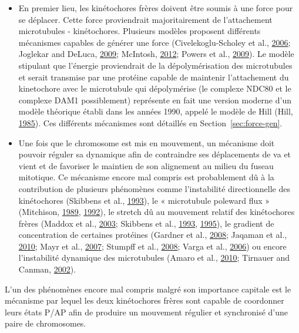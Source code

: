 \documentclass[12pt,a4paper,twoside,openright]{book}
\begin{document}
\begin{itemize}
\item
  En premier lieu, les kinétochores frères doivent être soumis à une
  force pour se déplacer. Cette force proviendrait majoritairement de
  l'attachement microtubules - kinétochores. Plusieurs modèles proposent
  différents mécanismes capables de générer une force
  (Civelekoglu-Scholey et al.,
  \hyperref[ref-Civelekoglu-Scholey2006]{2006}; Joglekar and DeLuca,
  \hyperref[ref-Joglekar2009]{2009}; McIntosh,
  \hyperref[ref-McIntosh2012]{2012}; Powers et al.,
  \hyperref[ref-Powers2009a]{2009}). Le modèle stipulant que l'énergie
  proviendrait de la dépolymérisation des microtubules et serait
  transmise par une protéine capable de maintenir l'attachement du
  kinetochore avec le microtubule qui dépolymérise (le complexe NDC80 et
  le complexe DAM1 possiblement) représente en fait une version moderne
  d'un modèle théorique établi dans les années 1990, appelé le modèle de
  Hill (Hill, \hyperref[ref-Hill1985]{1985}). Ces différents mécanismes
  sont détaillés en Section~\ref{sec:force-gen}.
\item
  Une fois que le chromosome est mis en mouvement, un mécanisme doit
  pouvoir réguler sa dynamique afin de contraindre ses déplacements de
  va et vient et de favoriser le maintien de son alignement au milieu du
  fuseau mitotique. Ce mécanisme encore mal compris est probablement dû
  à la contribution de plusieurs phénomènes comme l'instabilité
  directionnelle des kinétochores (Skibbens et al.,
  \hyperref[ref-Skibbens1993]{1993}), le « microtubule poleward flux »
  (Mitchison, \hyperref[ref-Mitchison1989]{1989},
  \hyperref[ref-Mitchison1992]{1992}), le stretch dû au mouvement
  relatif des kinétochores frères (Maddox et al.,
  \hyperref[ref-Maddox2003]{2003}; Skibbens et al.,
  \hyperref[ref-Skibbens1993]{1993}, \hyperref[ref-Skibbens1995]{1995}),
  le gradient de concentration de certaines protéines (Gardner et al.,
  \hyperref[ref-Gardner2008a]{2008}; Jaqaman et al.,
  \hyperref[ref-Jaqaman2010]{2010}; Mayr et al.,
  \hyperref[ref-Mayr2007]{2007}; Stumpff et al.,
  \hyperref[ref-Stumpff2008]{2008}; Varga et al.,
  \hyperref[ref-Varga2006]{2006}) ou encore l'instabilité dynamique des
  microtubules (Amaro et al., \hyperref[ref-Amaro2010a]{2010}; Tirnauer
  and Canman, \hyperref[ref-Tirnauer2002]{2002}).
\end{itemize}

L'un des phénomènes encore mal compris malgré son importance capitale
est le mécanisme par lequel les deux kinétochores frères sont capable de
coordonner leurs états P/AP afin de produire un mouvement régulier et
synchronisé d'une paire de chromosomes.
\end{document}
